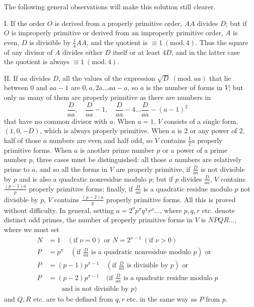 The following general observations will make this solution still clearer.

I. If the order \(O\) is derived from a properly primitive order, \(AA\) divides \(D\); but if \(O\) is improperly primitive or derived from an improperly primitive order, \(A\) is even, \(D\) is divisible by \(\frac14 AA\), and the quotient is \(\equiv1\ (\mathrm{mod.}\,4)\). Thus the square of any divisor of \(A\) divides either \(D\) itself or at least \(4D\), and in the latter case the quotient is always \(\equiv1\ (\mathrm{mod.}\,4)\).

II. If \(aa\) divides \(D\), all the values of the expression \(\surd D\ (\mathrm{mod.}\,aa)\) that lie between \(0\) and \(aa-1\) are \(0,a,2a\ldots aa-a\), so \(a\) is the number of forms in \(V\); but only as many of them are properly primitive as there are numbers in
\[
\frac{D}{aa},\quad\frac{D}{aa}-1,\quad\frac{D}{aa}-4\ldots\frac{D}{aa}-(a-1)^2
\]
that have no common divisor with \(a\). When \(a=1\), \(V\) consists of a single form, \((1,0,-D)\), which is always properly primitive. When \(a\) is \(2\) or any power of \(2\), half of those \(a\) numbers are even and half odd, so \(V\) contains \(\frac12 a\) properly primitive forms. When \(a\) is another prime number \(p\) or a power of a prime number \(p\), three cases must be distinguished: all those \(a\) numbers are relatively prime to \(a\), and so all the forms in \(V\) are properly primitive, if \(\frac{D}{aa}\) is not divisible by \(p\) and is also a quadratic nonresidue modulo \(p\); but if \(p\) divides \(\frac{D}{aa}\), \(V\) contains \(\frac{(p-1)a}{p}\) properly primitive forms; finally, if \(\frac{D}{aa}\) is a quadratic residue modulo \(p\) not divisible by \(p\), \(V\) contains \(\frac{(p-2)a}{p}\) properly primitive forms. All this is proved without difficulty. In general, setting \(a=2^\nu p^\pi q^\chi r^\rho\ldots\), where \(p,q,r\) etc. denote distinct odd primes, the number of properly primitive forms in \(V\) is \(NPQR\ldots\), where we must set
\[
\begin{aligned}
N&=1\quad(\text{if }\nu=0)\text{ or }N=2^{\nu-1}\ (\text{if }\nu>0)\\
P&=p^\pi\quad(\text{if }\tfrac{D}{aa}\text{ is a quadratic nonresidue modulo }p)\text{ or}\\
P&=(p-1)p^{\pi-1}\quad(\text{if }\tfrac{D}{aa}\text{ is divisible by }p\text{})\text{ or}\\
P&=(p-2)p^{\pi-1}\quad(\text{if }\tfrac{D}{aa}\text{ is a quadratic residue modulo }p\\ &\qquad\text{and is not divisible by }p\text{})
\end{aligned}
\]
and \(Q,R\) etc. are to be defined from \(q,r\) etc. in the same way as \(P\) from \(p\).

